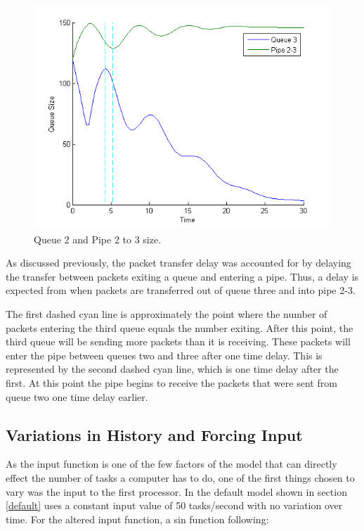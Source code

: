 \documentclass{article}
\begin{document}
\begin{figure}[H]
                \centering
                \includegraphics[width=0.8\linewidth]{Send_Receive_Delay}
                \caption{Queue 2 and Pipe 2 to 3 size.}
\end{figure}

\noindent
As discussed previously, the packet transfer delay was accounted for by delaying the transfer between packets exiting a queue and entering a pipe. Thus, a delay is expected from when packets are transferred out of queue three and into pipe 2-3. 

The first dashed cyan line is approximately the point where the number of packets entering the third queue equals the number exiting. After this point, the third queue will be sending more packets than it is receiving. These packets will enter the pipe between queues two and three after one time delay. This is represented by the second dashed cyan line, which is one time delay after the first. At this point the pipe begins to receive the packets that were sent from queue two one time delay earlier.  



\subsection{Variations in History and Forcing Input}

As the input function is one of the few factors of the model that can directly effect the number of tasks a computer has to do, one of the first things chosen to vary was the input to the first processor. In the default model shown in section \ref{default} uses a constant input value of 50 tasks/second with no variation over time. For the altered input function, a sin function following:
\end{document}
